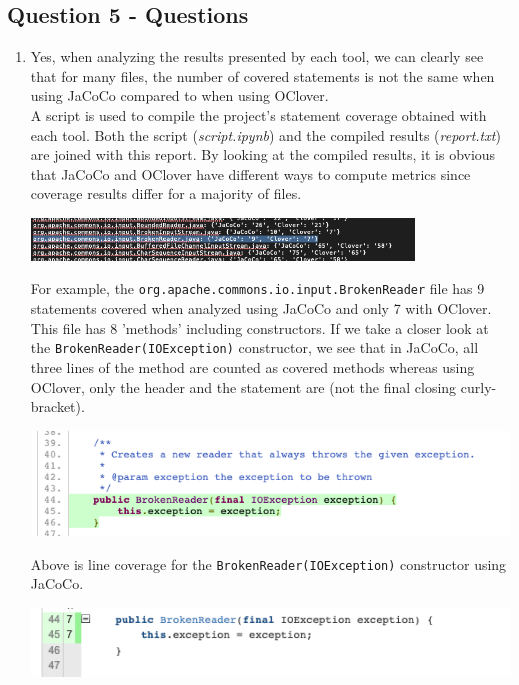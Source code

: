 \subsection*{Question 5 -  Questions}
\begin{enumerate}[label={\alph*)}]
    \item Yes, when analyzing the results presented by each tool, we can clearly see that for many files, the number of covered statements is not the same when using JaCoCo compared to when using OClover.\\ A script is used to compile the project's statement coverage obtained with each tool. Both the script (\textit{script.ipynb}) and the compiled results (\textit{report.txt}) are joined with this report. By looking at the compiled results, it is obvious that JaCoCo and OClover have different ways to compute metrics since coverage results differ for a majority of files.\\
    \begin{center}
        \includegraphics[width=0.8\textwidth]{img/brok.png}
    \end{center}
    For example, the \verb|org.apache.commons.io.input.BrokenReader| file has 9 statements covered when analyzed using JaCoCo and only 7 with OClover. This file has 8 'methods' including constructors. If we take a closer look at the \verb|BrokenReader(IOException)| constructor, we see that in JaCoCo, all three lines of the method are counted as covered methods whereas using OClover, only the header and the statement are (not the final closing curly-bracket).
    \begin{center}
        \includegraphics[width=1\textwidth]{img/jccex.png}
    \end{center}
    \noindent Above is line coverage for the \verb|BrokenReader(IOException)| constructor using JaCoCo.
    \begin{center}
        \includegraphics[width=1\textwidth]{img/cloex.png}

\end{center}
\end{enumerate}
